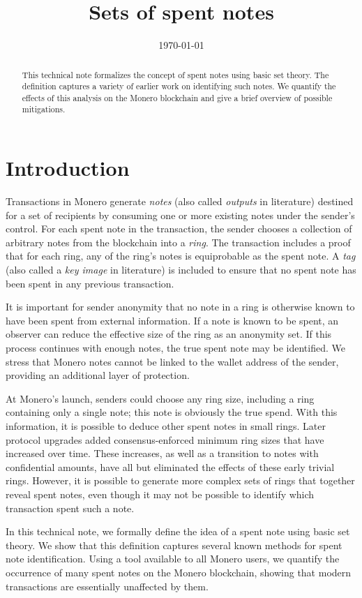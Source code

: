 \documentclass{mrl}
\title{Sets of spent notes}
\date{\today}
\begin{document}
\begin{abstract}
This technical note formalizes the concept of spent notes using basic set theory. The definition captures a variety of earlier work on identifying such notes. We quantify the effects of this analysis on the Monero blockchain and give a brief overview of possible mitigations.
\end{abstract}

\section{Introduction}
Transactions in Monero generate \textit{notes} (also called \textit{outputs} in literature) destined for a set of recipients by consuming one or more existing notes under the sender's control. For each spent note in the transaction, the sender chooses a collection of arbitrary notes from the blockchain into a \textit{ring}. The transaction includes a proof that for each ring, any of the ring's notes is equiprobable as the spent note. A \textit{tag} (also called a \textit{key image} in literature) is included to ensure that no spent note has been spent in any previous transaction.

It is important for sender anonymity that no note in a ring is otherwise known to have been spent from external information. If a note is known to be spent, an observer can reduce the effective size of the ring as an anonymity set. If this process continues with enough notes, the true spent note may be identified. We stress that Monero notes cannot be linked to the wallet address of the sender, providing an additional layer of protection.

At Monero's launch, senders could choose any ring size, including a ring containing only a single note; this note is obviously the true spend. With this information, it is possible to deduce other spent notes in small rings. Later protocol upgrades added consensus-enforced minimum ring sizes that have increased over time. These increases, as well as a transition to notes with confidential amounts, have all but eliminated the effects of these early trivial rings. However, it is possible to generate more complex sets of rings that together reveal spent notes, even though it may not be possible to identify which transaction spent such a note.

In this technical note, we formally define the idea of a spent note using basic set theory. We show that this definition captures several known methods for spent note identification. Using a tool available to all Monero users, we quantify the occurrence of many spent notes on the Monero blockchain, showing that modern transactions are essentially unaffected by them.
\end{document}

